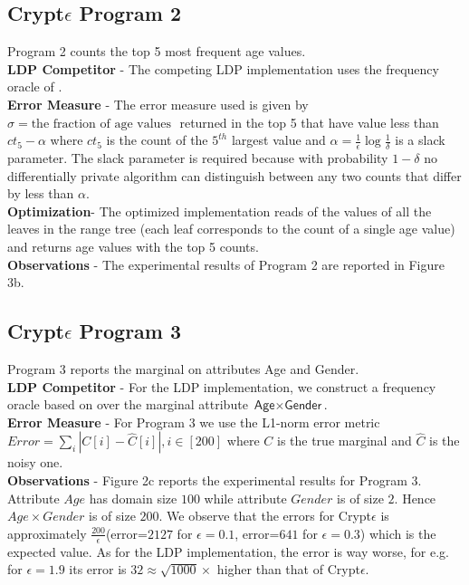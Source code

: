 \subsection*{Crypt$\epsilon$ Program 2}
Program 2 counts the top 5 most frequent age values.
\\\textbf{\textsf{LDP} Competitor} - The competing \textsf{LDP} implementation uses the frequency oracle of \cite{LDP1}. 
\\\textbf{Error Measure} - The error measure used is given by $\sigma= \text{the fraction of age values }$ returned in the top 5 that have value less than $ct_5-\alpha$  where  $ct_5$ is the count of the $5^{th}$ largest value and $\alpha=\frac{1}{\epsilon}\log\frac{1}{\delta}$ is a slack parameter. The slack parameter is required because with probability $1-\delta$ no differentially private algorithm can distinguish between any two counts that differ by less than $\alpha$. \\
\textbf{Optimization}- The optimized implementation reads of the values of all the leaves in  the range tree (each leaf corresponds to the count of a single age value) and returns age values with the top 5 counts.
\\\textbf{Observations} - The experimental results of  Program  2 are reported in  Figure 3b. 

\subsection*{Crypt$\epsilon$ Program 3}
Program 3 reports the marginal on attributes \textsf{Age} and \textsf{Gender}.  
\\\textbf{\textsf{LDP} Competitor} - For the  \textsf{LDP} implementation, we construct a frequency oracle based on \cite{LDP1} over the marginal attribute $\textsf{Age}\times\textsf{Gender}$. 
\\\textbf{Error Measure} - For Program 3 we use the L1-norm error metric $ Error=\sum_{i}|C[i]-\hat{C}[i]|, i \in [200]$ where $C$ is the true marginal and $\hat{C}$ is the noisy one. 
\\\textbf{Observations} - Figure 2c reports the experimental results for Program 3. Attribute $Age$ has domain size $100$ while attribute $Gender$ is of size $2$. Hence $Age\times Gender$ is of size $200$. We observe that the errors for Crypt$\epsilon$ is approximately $\frac{200}{\epsilon}$(error=$2127$ for $\epsilon=0.1$, error=$641$ for $\epsilon=0.3$) which is the expected value. As for the \textsf{LDP} implementation, the error is way worse, for e.g. for $\epsilon=1.9$ its error is $32 \approx \sqrt{1000} \times$ higher than that of Crypt$\epsilon$.

